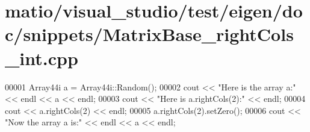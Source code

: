 \hypertarget{matio_2visual__studio_2test_2eigen_2doc_2snippets_2_matrix_base__right_cols__int_8cpp_source}{}\section{matio/visual\+\_\+studio/test/eigen/doc/snippets/\+Matrix\+Base\+\_\+right\+Cols\+\_\+int.cpp}
\label{matio_2visual__studio_2test_2eigen_2doc_2snippets_2_matrix_base__right_cols__int_8cpp_source}

\begin{DoxyCode}
00001 Array44i a = Array44i::Random();
00002 cout << \textcolor{stringliteral}{"Here is the array a:"} << endl << a << endl;
00003 cout << \textcolor{stringliteral}{"Here is a.rightCols(2):"} << endl;
00004 cout << a.rightCols(2) << endl;
00005 a.rightCols(2).setZero();
00006 cout << \textcolor{stringliteral}{"Now the array a is:"} << endl << a << endl;
\end{DoxyCode}
